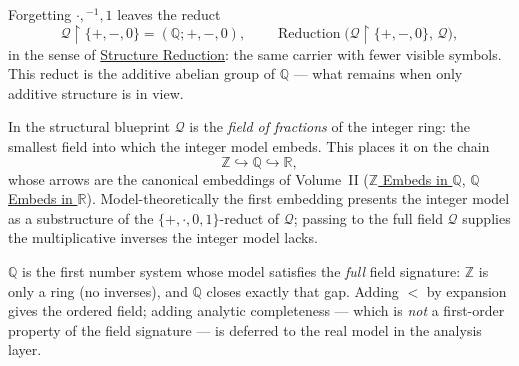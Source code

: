 \begin{remark*}
Forgetting $\cdot,{}^{-1},1$ leaves the reduct
\[
\mathcal{Q}\!\restriction\!\{+,-,0\}=(\mathbb{Q};+,-,0),
\qquad
\operatorname{Reduction}\!\bigl(\mathcal{Q}\!\restriction\!\{+,-,0\},\,\mathcal{Q}\bigr),
\]
in the sense of \hyperref[def:structure-reduction]{Structure Reduction}: the same
carrier with fewer visible symbols. This reduct is the additive abelian group of
$\mathbb{Q}$ --- what remains when only additive structure is in view.
\end{remark*}

\begin{remark*}
In the structural blueprint $\mathcal{Q}$ is the \emph{field of fractions} of the
integer ring: the smallest field into which the integer model embeds. This
places it on the chain
\[
\mathbb{Z}\hookrightarrow\mathbb{Q}\hookrightarrow\mathbb{R},
\]
whose arrows are the canonical embeddings of Volume~II
(\hyperref[thm:z-embeds-in-q]{$\mathbb{Z}$ Embeds in $\mathbb{Q}$},
\hyperref[thm:q-embeds-in-r]{$\mathbb{Q}$ Embeds in $\mathbb{R}$}).
Model-theoretically the first embedding presents the integer model as a
substructure of the $\{+,\cdot,0,1\}$-reduct of $\mathcal{Q}$; passing to the
full field $\mathcal{Q}$ supplies the multiplicative inverses the integer model
lacks.
\end{remark*}

\begin{remark*}[Interpretation]
$\mathbb{Q}$ is the first number system whose model satisfies the \emph{full}
field signature: $\mathbb{Z}$ is only a ring (no inverses), and $\mathbb{Q}$
closes exactly that gap. Adding $<$ by expansion gives the ordered field; adding
analytic completeness --- which is \emph{not} a first-order property of the field
signature --- is deferred to the real model in the analysis layer.
\end{remark*}